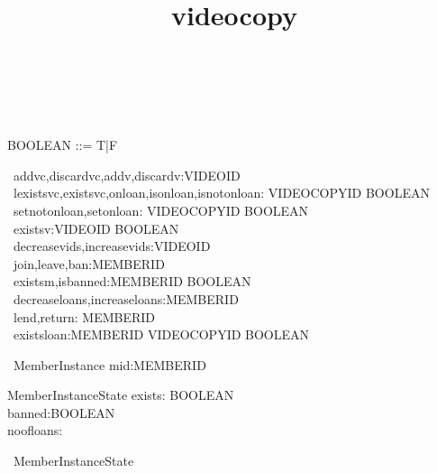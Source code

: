 \documentclass{article}
\begin{document}
\title{videocopy}

\maketitle

\begin{zed}
   [VIDEOCOPYID] \\
   [VIDEOID]\\
   [MEMBERID] \\
   BOOLEAN ::= T|F \\

\end{zed}

\begin{circus}
     \circchannel\ addvc,discardvc,addv,discardv:VIDEOID \\
     \circchannel\ lexistsvc,existsvc,onloan,isonloan,isnotonloan: VIDEOCOPYID \cross BOOLEAN \\
     \circchannel\ setnotonloan,setonloan: VIDEOCOPYID \cross BOOLEAN\\
     \circchannel\ existsv:VIDEOID \cross BOOLEAN\\
     \circchannel\ decreasevids,increasevids:VIDEOID \cross \nat\\
     \circchannel\ join,leave,ban:MEMBERID\\
     \circchannel\ existsm,isbanned:MEMBERID \cross BOOLEAN\\
     \circchannel\ decreaseloans,increaseloans:MEMBERID \cross \nat\\
     \circchannel\ lend,return: MEMBERID \\
     \circchannel\ existsloan:MEMBERID \cross VIDEOCOPYID \cross BOOLEAN\\
\end{circus}

\begin{circus}
    \circprocess\ MemberInstance \circdef mid:MEMBERID \circspot \circbegin
\end{circus}

\begin{schema}{MemberInstanceState}
	exists: BOOLEAN\\
	banned:BOOLEAN\\
	noofloans:\nat\\
\end{schema}

\begin{circusaction}
   \circstate\ MemberInstanceState
\end{circusaction}
\end{document}
